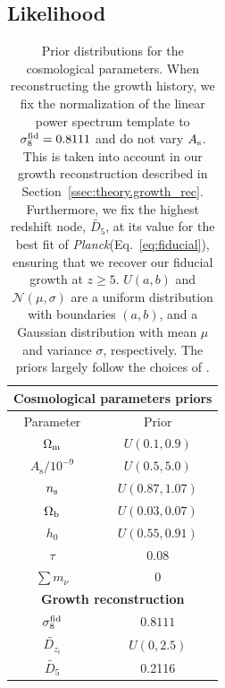 \documentclass[a4paper,11pt]{article}
\newcommand{\cN}{\mathcal{N}}
\newcommand{\Om}{\Omega_{\rm m}}
\newcommand{\Ob}{\Omega_{\rm b}}
\newcommand{\ns}{n_{\rm s}}
\newcommand{\planck}{{\sl Planck}\xspace}
\begin{document}
    \subsection{Likelihood}\label{ssec:meth.like}
      \begin{table}
        \centering
        \def\arraystretch{1.2}
        \begin{tabular}{|cc|}
        \hline
        \multicolumn{2}{|c|}{\textbf{Cosmological parameters priors}} \\
        \hline
        Parameter &  Prior\\  
        \hline 
        $\Om$  &  $U (0.1, 0.9)$                             \\ 
        $A_\mathrm{s}/10^{-9}$ &  $U (0.5, 5.0)$             \\
        $\ns$ & $U (0.87, 1.07)$                             \\
        $\Ob$  &  $U (0.03, 0.07)$                           \\
        $h_0$   &  $U (0.55, 0.91)$                          \\
        $\tau$  & 0.08                                       \\
        $\sum m_\nu$ & 0                                     \\ 
        \hline
        \multicolumn{2}{|c|}{\textbf{Growth reconstruction}} \\
        $\sigma_8^{\rm fid}$ &    $0.8111$             \\
        $\tilde{D_{z_i}}$ & $U(0, 2.5)$        \\
        $\tilde{D_5}$ & 0.2116\\
        \hline
        \end{tabular}
        \caption{Prior distributions for the cosmological parameters. When reconstructing the growth history, we fix the normalization of the linear power spectrum template to $\sigma_8^{\rm fid} = 0.8111$ and do not vary $A_{\rm s}$. This is taken into account in our growth reconstruction described in Section~\ref{ssec:theory.growth_rec}. Furthermore, we fix the highest redshift node, $\tilde{D_5}$, at its value for the best fit of \planck (Eq.~\ref{eq:fiducial}), ensuring that we recover our fiducial growth at $z\geq 5$. $U(a, b)$ and $\cN(\mu, \sigma)$ are a uniform distribution with boundaries $(a, b)$, and a Gaussian distribution with mean $\mu$ and variance $\sigma$, respectively. The priors largely follow the choices of \cite{1810.02322}. }\label{tab:priors_cosmo}
      \end{table}
\end{document}
